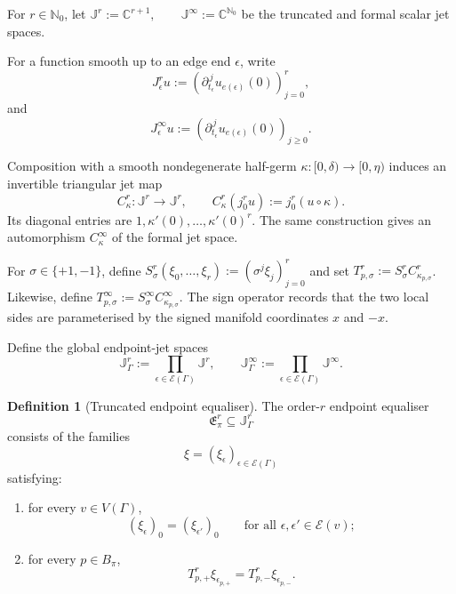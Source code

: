 \documentclass[11pt]{article}
\theoremstyle{plain}
\theoremstyle{definition}
\newtheorem{definition}[theorem]{Definition}
\begin{document}
For \(r\in\mathbb N_0\), let \(\mathbb J^r:=\mathbb C^{r+1}, \qquad \mathbb J^\infty:=\mathbb C^{\mathbb N_0}\) be the truncated and formal scalar jet spaces.

For a function smooth up to an edge end \(\epsilon\), write
\[
  J_\epsilon^r u
  :=
  \left(
    \partial_{t_\epsilon}^{\,j}
    u_{e(\epsilon)}(0)
  \right)_{j=0}^r,
\]
and
\[
  J_\epsilon^\infty u
  :=
  \left(
    \partial_{t_\epsilon}^{\,j}
    u_{e(\epsilon)}(0)
  \right)_{j\geq0}.
\]

Composition with a smooth nondegenerate half-germ \(\kappa:[0,\delta)\longrightarrow[0,\eta)\) induces an invertible triangular jet map
\[
  C_\kappa^r:
  \mathbb J^r\longrightarrow\mathbb J^r,
  \qquad
  C_\kappa^r(j_0^r u)
  :=
  j_0^r(u\circ\kappa).
\]
Its diagonal entries are
\(1, \kappa'(0), \ldots, \kappa'(0)^r\).
The same construction gives an automorphism \(C_\kappa^\infty\) of the formal jet space.

For
\(\sigma\in\{+1,-1\}\),
define \(S_\sigma^r(\xi_0,\ldots,\xi_r) := \left( \sigma^j\xi_j \right)_{j=0}^r\) and set
\(T_{p,\sigma}^r := S_\sigma^r C_{\kappa_{p,\sigma}}^r\).
Likewise, define
\(T_{p,\sigma}^\infty := S_\sigma^\infty C_{\kappa_{p,\sigma}}^\infty\).
The sign operator records that the two local sides are parameterised by
the signed manifold coordinates \(x\) and \(-x\).

Define the global endpoint-jet spaces
\[
  \mathbb J_\Gamma^r
  :=
  \prod_{\epsilon\in\mathcal E(\Gamma)}
  \mathbb J^r,
  \qquad
  \mathbb J_\Gamma^\infty
  :=
  \prod_{\epsilon\in\mathcal E(\Gamma)}
  \mathbb J^\infty.
\]

\begin{definition}[Truncated endpoint equaliser]
\label{def:truncated-graph-equaliser}
The order-\(r\) endpoint equaliser
\[
  \mathfrak E_\pi^r
  \subseteq
  \mathbb J_\Gamma^r
\]
consists of the families
\[
  \xi
  =
  (\xi_\epsilon)_{\epsilon\in\mathcal E(\Gamma)}
\]
satisfying:

\begin{enumerate}[label=\textup{(\alph*)}]
  \item for every \(v\in V(\Gamma)\),
        \[
          (\xi_\epsilon)_0
          =
          (\xi_{\epsilon'})_0
          \qquad
          \text{for all }
          \epsilon,\epsilon'\in\mathcal E(v);
        \]

  \item for every \(p\in B_\pi\),
        \[
          T_{p,+}^r\xi_{\epsilon_{p,+}}
          =
          T_{p,-}^r\xi_{\epsilon_{p,-}}.
        \]
\end{enumerate}
\end{definition}
\end{document}
